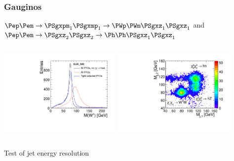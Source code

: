 \documentclass{beamer}
\begin{document}
\begin{frame}
\frametitle{Gauginos}
{\footnotesize $\Pep\Pem \to \PSgxpm_1 \PSgxmp_1\to\PWp\PWm\PSgxz_1\PSgxz_1$ and
$\Pep\Pem \to \PSgxz_2 \PSgxz_2\to \Ph\Ph\PSgxz_1\PSgxz_1$}
\begin{columns}[c]
\column{6cm}
\centering
\includegraphics[width=6cm]{../SIDWorkshop/W_reconstruction_mass.pdf}
\column{6cm}
\includegraphics[width=6cm]{../WhizardWorkshop/MassPlot2D}
\end{columns}
\alert{Test of jet energy resolution}
\end{frame}
\end{document}
